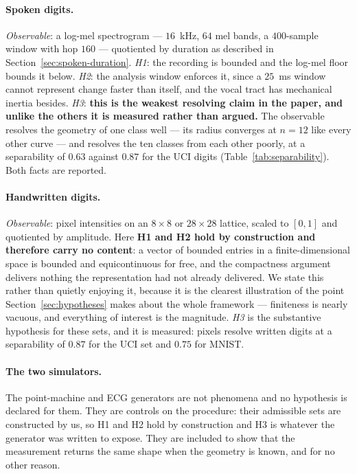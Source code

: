 \documentclass[10pt]{article}
\theoremstyle{plain}
\theoremstyle{definition}
\theoremstyle{remark}
\begin{document}
\paragraph{Spoken digits.}
\emph{Observable}: a log-mel spectrogram --- $16$~kHz, $64$ mel bands, a
$400$-sample window with hop $160$ --- quotiented by duration as described in
Section~\ref{sec:spoken-duration}. \emph{H1}: the recording is bounded and the
log-mel floor bounds it below. \emph{H2}: the analysis window enforces it, since
a $25$~ms window cannot represent change faster than itself, and the vocal tract
has mechanical inertia besides. \emph{H3}: \textbf{this is the weakest resolving
claim in the paper, and unlike the others it is measured rather than argued.}
The observable resolves the geometry of one class well --- its radius converges
at $n=12$ like every other curve --- and resolves the ten classes from each other
poorly, at a separability of $0.63$ against $0.87$ for the UCI digits
(Table~\ref{tab:separability}). Both facts are reported.

\paragraph{Handwritten digits.}
\emph{Observable}: pixel intensities on an $8\times8$ or $28\times28$ lattice,
scaled to $[0,1]$ and quotiented by amplitude. Here \textbf{H1 and H2 hold by
construction and therefore carry no content}: a vector of bounded entries in a
finite-dimensional space is bounded and equicontinuous for free, and the
compactness argument delivers nothing the representation had not already
delivered. We state this rather than quietly enjoying it, because it is the
clearest illustration of the point Section~\ref{sec:hypotheses} makes about the
whole framework --- finiteness is nearly vacuous, and everything of interest is
the magnitude. \emph{H3} is the substantive hypothesis for these sets, and it is
measured: pixels resolve written digits at a separability of $0.87$ for the UCI
set and $0.75$ for MNIST.

\paragraph{The two simulators.}
The point-machine and ECG generators are not phenomena and no hypothesis is
declared for them. They are controls on the procedure: their admissible sets are
constructed by us, so H1 and H2 hold by construction and H3 is whatever the
generator was written to expose. They are included to show that the measurement
returns the same shape when the geometry is known, and for no other reason.
\end{document}
